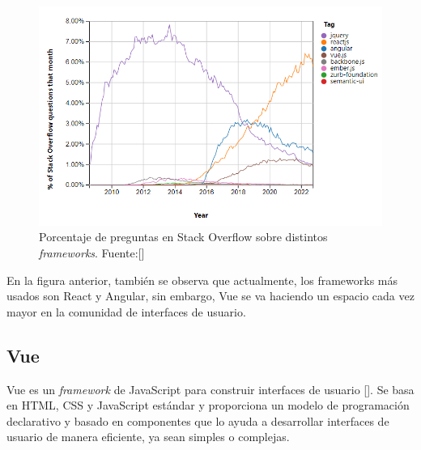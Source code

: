 \begin{figure}[!h]
\centering
\includegraphics[scale=0.9]{Graphics/stackoverflow}
\caption{Porcentaje de preguntas en Stack Overflow sobre distintos \textit{frameworks}. Fuente:[\cite{50}]}
\label{fig:stackoverflow}
\end{figure}

En la figura anterior, también se observa que actualmente, los frameworks más usados son React y Angular, sin embargo, Vue se va haciendo un espacio cada vez mayor en la comunidad de interfaces de usuario.


\subsection{Vue}
Vue es un \textit{framework} de JavaScript para construir interfaces de usuario [\cite{47}]. Se basa en HTML, CSS y JavaScript estándar y proporciona un modelo de programación declarativo y basado en componentes que lo ayuda a desarrollar interfaces de usuario de manera eficiente, ya sean simples o complejas.

